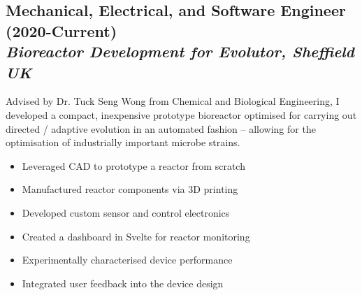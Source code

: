\documentclass[twocolumn, a4paper, fontsize=9pt, headsepline, footsepline]{scrartcl}
\begin{document}
\subsection*{Mechanical, Electrical, and Software Engineer
  (2020-Current)\\\textmd{\emph{Bioreactor Development for Evolutor, Sheffield UK}}}
\noindent
Advised by Dr. Tuck Seng Wong from Chemical and Biological Engineering, I
developed a compact, inexpensive prototype bioreactor optimised for carrying out
directed / adaptive evolution in an automated fashion – allowing for the
optimisation of industrially important microbe strains.
\begin{itemize}
\item Leveraged CAD to prototype a reactor from scratch
\item Manufactured reactor components via 3D printing
\item Developed custom sensor and control electronics
\item Created a dashboard in Svelte for reactor monitoring
\item Experimentally characterised device performance
\item Integrated user feedback into the device design
\end{itemize}

\end{document}
